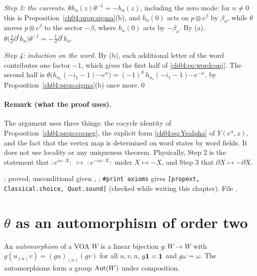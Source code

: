 \emph{Step 3: the currents.} $\theta h_a(z)\theta^{-1}=-h_a(z)$, including the zero mode: for
$n\neq0$ this is Proposition~\ref{ch04:prop:sigma}(b), and $h_a(0)$ acts on $p\otimes e^\beta$ by
$\beta_a$, while $\theta$ moves $p\otimes e^\beta$ to the sector $-\beta$, where $h_a(0)$ acts by
$-\beta_a$. By (a), $\theta\big(\tfrac1{i!}\partial^ih_a\big)\theta^{-1}=-\tfrac1{i!}\partial^ih_a$.

\emph{Step 4: induction on the word.} By (b), each additional letter of the word contributes one
factor $-1$, which gives the first half of \eqref{ch04:eq:wordconj}. The second half is
$\theta\big(h_{a_1}(-i_1-1)\cdots e^\alpha\big)=(-1)^k\,h_{a_1}(-i_1-1)\cdots e^{-\alpha}$, by
Proposition~\ref{ch04:prop:sigma}(b) once more.\qed

\paragraph{Remark (what the proof uses).} The argument uses three things: the cocycle identity of
Proposition~\ref{ch04:prop:cocneg}, the explicit form \eqref{ch04:eq:Yealpha} of $Y(e^\alpha,z)$, and the
fact that the vertex map is determined on word states by word fields. It does not use locality or
any uniqueness theorem. Physically, Step 2 is the statement that
$:\!e^{i\alpha\cdot X}\!:\;\mapsto\;:\!e^{-i\alpha\cdot X}\!:$ under $X\mapsto -X$, and Step 3 that
$\partial X\mapsto-\partial X$.

\begin{status}
: proved, unconditional given , ;
\texttt{\#print axioms} gives \texttt{[propext, Classical.choice, Quot.sound]} (checked while
writing this chapter). File .
\end{status}

\section{\texorpdfstring{$\theta$}{theta} as an automorphism of order two}\label{ch04:sec:aut}

\begin{definition}\label{ch04:def:aut}
An \emph{automorphism} of a VOA $W$ is a linear bijection $g:W\to W$ with
$g(u_{(n)}v)=(gu)_{(n)}(gv)$ for all $u,v,n$, $g\mathbf{1}=\mathbf{1}$ and $g\omega=\omega$. The
automorphisms form a group $\operatorname{Aut}(W)$ under composition.
\end{definition}

